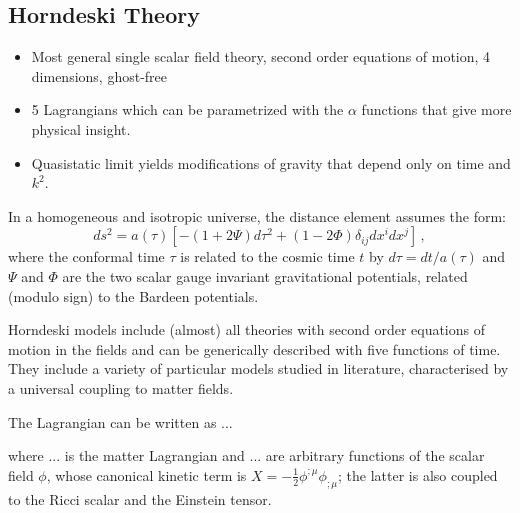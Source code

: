 \subsection{Horndeski Theory}
\begin{itemize}
\item Most general single scalar field theory, second order equations of
motion, 4 dimensions, ghost-free
\item 5 Lagrangians which can be parametrized with the $\alpha$ functions
that give more physical insight.
\item Quasistatic limit yields modifications of gravity that depend only
on time and $k^{2}$.
\end{itemize}

In a homogeneous and isotropic universe, the distance element
assumes the form: 
\begin{equation}
ds^{2}=a(\tau)[-(1+2\Psi)d\tau^{2}+(1-2\Phi)\delta_{ij}dx^{i}dx^{j}]\,,
\end{equation}
where the conformal time $\tau$ is related to the cosmic time $t$
by $d\tau=d t/a(\tau)$ and $\Psi$ and $\Phi$ are the two scalar
gauge invariant gravitational potentials, related (modulo sign) to
the Bardeen potentials.

Horndeski models include (almost) all theories
with second order equations of motion in the fields and can be generically
described with five functions of time. They include a variety of particular
models studied in literature, characterised by a universal coupling
to matter fields.

The Lagrangian can be written as ...

where ... is the matter Lagrangian and ... are arbitrary functions
of the scalar field $\phi$, whose canonical kinetic term is $X=-\frac{1}{2}\phi^{;\mu}\phi_{;\mu}$;
the latter is also coupled to the Ricci scalar and the Einstein tensor.

